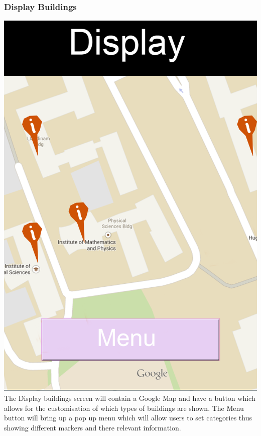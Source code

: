 \documentclass[10pt,a4paper]{article}
\begin{document}
\subsubsection{Display Buildings}
\includegraphics[scale=0.6]{Display.png}\\
The Display buildings screen will contain a Google Map and have a button which allows for the customisation of which types of buildings are shown. The Menu button will bring up a pop up menu which will allow users to set categories thus showing different markers and there relevant information. 
\end{document}

